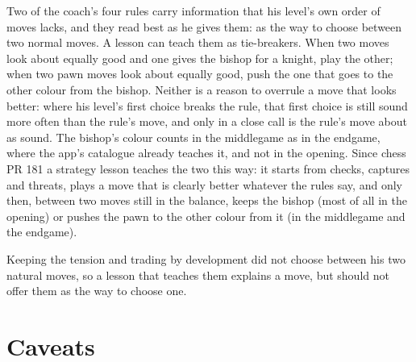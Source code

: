 \documentclass[11pt]{article}
\begin{document}
Two of the coach's four rules carry information that his level's own order of moves lacks, and
they read best as he gives them: as the way to choose between two normal moves. A lesson can teach
them as tie-breakers. When two moves look about equally good and one gives the bishop for a knight,
play the other; when two pawn moves look about equally good, push the one that goes to the other
colour from the bishop. Neither is a reason to overrule a move that looks better: where his level's
first choice breaks the rule, that first choice is still sound more often than the rule's move, and
only in a close call is the rule's move about as sound. The bishop's colour counts in the
middlegame as in the endgame, where the app's catalogue already teaches it, and not in the opening.
Since chess PR 181 a strategy lesson teaches the two this way: it starts from checks, captures and
threats, plays a move that is clearly better whatever the rules say, and only then, between two
moves still in the balance, keeps the bishop (most of all in the opening) or pushes the pawn to the
other colour from it (in the middlegame and the endgame).

Keeping the tension and trading by development did not choose between his two natural moves, so a
lesson that teaches them explains a move, but should not offer them as the way to choose one.

\section{Caveats}
\end{document}
